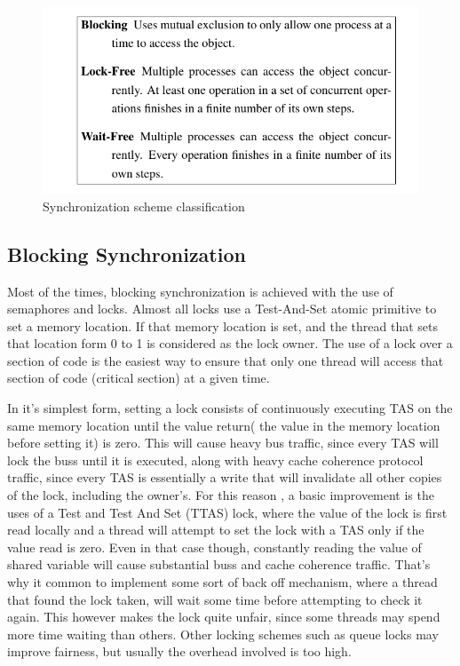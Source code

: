  \begin{figure}

 \centering

  \includegraphics[scale=0.5]{progress_gar.png}

\caption{Synchronization scheme classification}

\label{progress_gar}

\end{figure}


\subsection{Blocking Synchronization}

Most of the times, blocking synchronization is achieved with the use of semaphores and locks. Almost all locks use a Test-And-Set atomic primitive to set a memory location. If that memory location is set,  and the thread that sets that location form 0 to 1 is considered as the lock owner. The use of a lock over a section of code is the easiest way to ensure that only one thread will access that section of code (critical section) at a given time.

In it's simplest form, setting a lock consists of  continuously executing TAS on the same memory location until the value return( the value in the memory location before setting it) is zero. This will cause heavy bus traffic, since every TAS will lock the buss until it is executed, along with heavy cache coherence protocol traffic, since every TAS is essentially a write that will invalidate all other copies of the lock, including the owner's. For this reason , a basic improvement is the uses of a Test and Test And Set (TTAS) lock, where the value of the lock is first read locally and a thread will attempt to set the lock with a TAS only if the value read is zero. Even in that case though, constantly reading the value of shared variable will cause substantial buss and cache coherence traffic. That's why it common to implement some sort of back off mechanism, where a thread that found the lock taken, will wait some time before attempting to check it again. This however makes the lock quite unfair, since some threads may spend more time waiting than others. Other locking schemes such as queue locks may improve fairness, but usually the overhead involved is too high.

